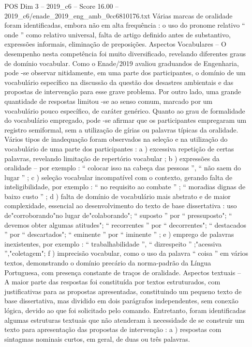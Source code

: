 \begin{textsample}{POS Dim 3 – 2019\_c6 – Score 16.00 – 2019\_c6/enade\_2019\_eng\_amb\_0cc6810176.txt}
Várias marcas de oralidade foram identificadas, embora não em alta frequência : o uso do pronome relativo “ onde ” como relativo universal, falta de artigo definido antes de substantivo, expressões informais, eliminação de preposições.
Aspectos Vocabulares – O desempenho nesta competência foi muito diversificado, revelando diferentes graus de domínio vocabular.
Como o Enade/2019 avaliou graduandos de Engenharia, pode -se observar nitidamente, em uma parte dos participantes, o domínio de um vocabulário específico na discussão da questão dos desastres ambientais e das propostas de intervenção para esse grave problema.
Por outro lado, uma grande quantidade de respostas limitou -se ao senso comum, marcado por um vocabulário pouco específico, de caráter genérico.
Quanto ao grau de formalidade do vocabulário empregado, pode -se afirmar que os participantes empregaram um registro semiformal, sem a utilização de gírias ou palavras típicas da oralidade.
Vários tipos de inadequação foram observados na seleção e na utilização do vocabulário de uma parte dos participantes : a ) excessiva repetição de certas palavras, revelando limitação de repertório vocabular ; b ) expressões da oralidade – por exemplo : “ colocar isso na cabeça das pessoas ”, “ não saem do lugar ” ; c ) seleção vocabular incompatível com o contexto, gerando falta de inteligibilidade, por exemplo : “ no requisito ao combate ” ; “ moradias dignas de baixo custo ” ; d ) falta de domínio de vocabulário mais abstrato e de maior complexidade, essencial ao desenvolvimento do texto de base dissertativa : uso de"corroborando"no lugar de"colaborando"; “ suposto ” por “ pressuposto"; “ devemos obter algumas atitudes"; “ recorrentes ” por “ decorrentes"; “ destacados ” por “ descartados"; “ eminente ” por “ iminente ” ; e ) emprego de palavras inexistentes, por exemplo : “ trabalhabilidade ”, “ dizrespeito ” ;"acessiva ”,"coletagem"; f ) imprecisão vocabular, como o uso da palavra “ coisa ” em vários textos, demonstrando o domínio precário da norma-padrão da Língua Portuguesa, com presença constante de traços de oralidade.
Aspectos textuais – A maior parte das respostas foi constituída por textos estruturados, com justificativas para as propostas apresentadas, constituindo um pequeno texto de base dissertativa, mas dividido em dois parágrafos independentes, sem conexão lógica, devido ao que foi solicitado pelo comando.
Entretanto, foram identificadas algumas estruturas textuais que não atenderam à necessidade de se construir um texto para apresentação das propostas de intervenção : a ) respostas com sintagmas nominais curtos, em geral, de duas ou três palavras.

\end{textsample}

